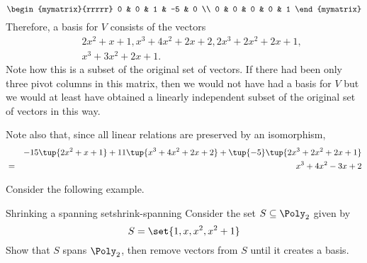 \begin{solution}
\begin{equation*}
\begin{mymatrix}{rrrrr}
0 & 0 & 1 & -5 & 0 \\ 
0 & 0 & 0 & 0 & 1
\end{mymatrix}
\end{equation*}
Therefore, a basis for $V$ consists of the vectors
\begin{eqnarray*}
&&2x^{2}+x+1,x^{3}+4x^{2}+2x+2,2x^{3}+2x^{2}+2x+1, \\
&&x^{3}+3x^{2}+2x+1.
\end{eqnarray*}
Note how this is a subset of the original set of vectors. If there had been
only three pivot columns in this matrix, then we would not have had a basis
for $V$ but we would at least have obtained a linearly independent subset of
the original set of vectors in this way. 

Note also that, since all linear relations are preserved by an isomorphism,
\begin{eqnarray*}
&&-15\tup{2x^{2}+x+1} +11\tup{x^{3}+4x^{2}+2x+2} +\tup{
-5} \tup{2x^{3}+2x^{2}+2x+1} \\
&=&x^{3}+4x^{2}-3x+2
\end{eqnarray*}

\end{solution}

Consider the following example.

\begin{example}{Shrinking a spanning set}{shrink-spanning}
Consider the set $S \subseteq \Poly_2$ given by 
\[
S = \set{1, x, x^2, x^2 + 1 }
\]
Show that $S$ spans $\Poly_2$, then remove vectors from $S$ until it creates a basis. 
\end{example}

